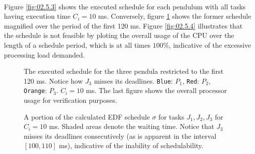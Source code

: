 \noindent{}\\


Figure \ref{fig:02.5.3} shows the executed schedule for each pendulum with all
tasks having execution time $C_i = 10$ ms. Conversely, figure
\ref{fig:02.5.3.small} shows the former schedule magnified over the period of
the first 120 ms. Figure \ref{fig:02.5.4} illustrates that the schedule
is not feasible by ploting the overall usage of the CPU over the length of a
schedule period, which is at all times $100\%$, indicative of the excessive
processing load demanded.

\begin{sidewaysfigure}

  \begin{figure}[H]\centering
    \scalebox{1}{}
    \caption{The executed schedule for the three pendula restricted to the first
      120 ms. Notice how $J_3$ misses its deadlines.
      \texttt{Blue}: $P_1$, \texttt{Red}: $P_2$,
      \texttt{Orange}: $P_3$. $C_i = 10$ ms. The last figure shows the overall
      processor usage for verification purposes.}
  \label{fig:02.5.3.small}
  \end{figure}

  \begin{figure}[H]\centering
    \scalebox{0.7}{}
    \caption{A portion of the calculated EDF schedule $\sigma$ for tasks
      $J_1, J_2, J_3$ for $C_i = 10$ ms. Shaded areas denote the waiting time.
      Notice that $J_3$ misses its deadlines consecutively (as is apparent in
      the interval $[100, 110]$ ms), indicative of the inability of
      schedulability.}
    \label{fig:edf_10}
  \end{figure}
\end{sidewaysfigure}


